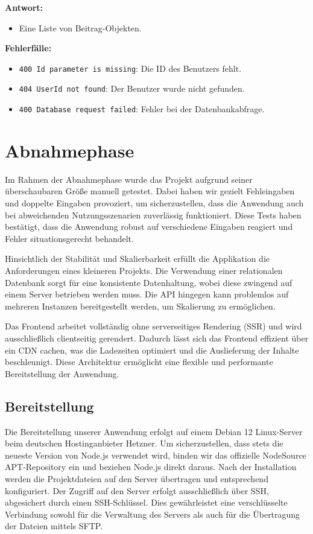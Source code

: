\documentclass[a4paper,12pt]{article}
\begin{document}
\textbf{Antwort:}
\begin{itemize}
    \item Eine Liste von Beitrag-Objekten.
\end{itemize}

\textbf{Fehlerfälle:}
\begin{itemize}
    \item \texttt{400 Id parameter is missing}:
        Die ID des Benutzers fehlt.
    \item \texttt{404 UserId not found}:
        Der Benutzer wurde nicht gefunden.
    \item \texttt{400 Database request failed}:
        Fehler bei der Datenbankabfrage.
\end{itemize}

\newpage \section{Abnahmephase}

Im Rahmen der Abnahmephase wurde das Projekt aufgrund seiner überschaubaren
Größe manuell getestet. Dabei haben wir gezielt Fehleingaben und doppelte
Eingaben provoziert, um sicherzustellen, dass die Anwendung auch bei
abweichenden Nutzungsszenarien zuverlässig funktioniert. Diese Tests haben
bestätigt, dass die Anwendung robust auf verschiedene Eingaben reagiert und
Fehler situationsgerecht behandelt.

Hinsichtlich der Stabilität und Skalierbarkeit erfüllt die Applikation die
Anforderungen eines kleineren Projekts. Die Verwendung einer relationalen
Datenbank sorgt für eine konsistente Datenhaltung, wobei diese zwingend auf
einem Server betrieben werden muss. Die API hingegen kann problemlos auf
mehreren Instanzen bereitgestellt werden, um Skalierung zu ermöglichen.

Das Frontend arbeitet vollständig ohne serverseitiges Rendering (SSR) und wird
ausschließlich clientseitig gerendert. Dadurch lässt sich das Frontend
effizient über ein CDN cachen, was die Ladezeiten optimiert und die
Auslieferung der Inhalte beschleunigt. Diese Architektur ermöglicht eine
flexible und performante Bereitstellung der Anwendung.

\subsection{Bereitstellung}

Die Bereitstellung unserer Anwendung erfolgt auf einem Debian 12 Linux-Server
beim deutschen Hostinganbieter Hetzner. Um sicherzustellen, dass stets die
neueste Version von Node.js verwendet wird, binden wir das offizielle
NodeSource APT-Repository ein und beziehen Node.js direkt daraus. Nach der
Installation werden die Projektdateien auf den Server übertragen und
entsprechend konfiguriert. Der Zugriff auf den Server erfolgt ausschließlich
über SSH, abgesichert durch einen SSH-Schlüssel. Dies gewährleistet eine
verschlüsselte Verbindung sowohl für die Verwaltung des Servers als auch für
die Übertragung der Dateien mittels SFTP.
\end{document}
